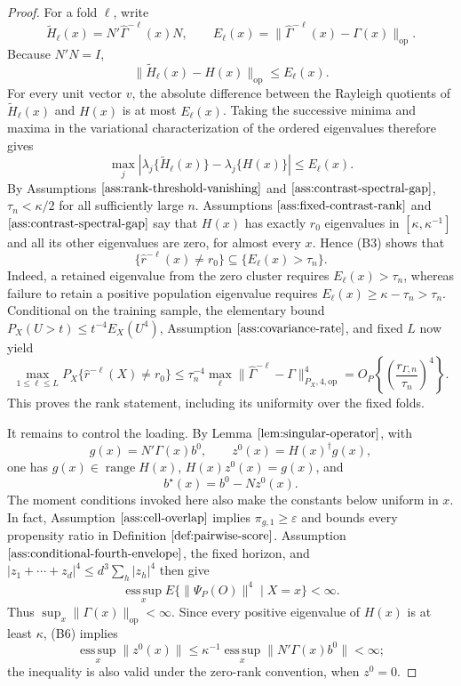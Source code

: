 \documentclass{article}
\begin{document}
\begin{proof}
For a fold \(\ell\), write
\[
 \widetilde H_\ell(x)=N'\widehat\Gamma^{-\ell}(x)N,
 \qquad
 E_\ell(x)=\|\widehat\Gamma^{-\ell}(x)-\Gamma(x)\|_{\mathrm{op}}.
 \tag{B1}
\]
Because \(N'N=I\),
\[
 \|\widetilde H_\ell(x)-H(x)\|_{\mathrm{op}}
 \le E_\ell(x).
 \tag{B2}
\]
For every unit vector \(v\), the absolute difference between the Rayleigh quotients of \(\widetilde H_\ell(x)\) and \(H(x)\) is at most \(E_\ell(x)\).  Taking the successive minima and maxima in the variational characterization of the ordered eigenvalues therefore gives
\[
 \max_j|\lambda_j\{\widetilde H_\ell(x)\}-\lambda_j\{H(x)\}|
 \le E_\ell(x).
 \tag{B3}
\]
By Assumptions \(\ref{ass:rank-threshold-vanishing}\) and \(\ref{ass:contrast-spectral-gap}\), \(\tau_n<\kappa/2\) for all sufficiently large \(n\).  Assumptions \(\ref{ass:fixed-contrast-rank}\) and \(\ref{ass:contrast-spectral-gap}\) say that \(H(x)\) has exactly \(r_0\) eigenvalues in \([\kappa,\kappa^{-1}]\) and all its other eigenvalues are zero, for almost every \(x\).  Hence (B3) shows that
\[
 \{\widehat r^{-\ell}(x)\ne r_0\}\subseteq\{E_\ell(x)>\tau_n\}.
 \tag{B4}
\]
Indeed, a retained eigenvalue from the zero cluster requires \(E_\ell(x)>\tau_n\), whereas failure to retain a positive population eigenvalue requires \(E_\ell(x)\ge\kappa-\tau_n>\tau_n\).  Conditional on the training sample, the elementary bound \(P_X(U>t)\le t^{-4}E_X(U^4)\), Assumption \(\ref{ass:covariance-rate}\), and fixed \(L\) now yield
\[
 \max_{1\le\ell\le L}P_X\{\widehat r^{-\ell}(X)\ne r_0\}
 \le \tau_n^{-4}\max_\ell\|\widehat\Gamma^{-\ell}-\Gamma\|_{P_X,4,\mathrm{op}}^4
 =O_P\!\left\{\left(\frac{r_{\Gamma,n}}{\tau_n}\right)^4\right\}.
 \tag{B5}
\]
This proves the rank statement, including its uniformity over the fixed folds.

It remains to control the loading.  By Lemma \(\ref{lem:singular-operator}\), with
\[
 g(x)=N'\Gamma(x)b^0,
 \qquad
 z^0(x)=H(x)^\dagger g(x),
 \tag{B6}
\]
one has \(g(x)\in\operatorname{range}H(x)\), \(H(x)z^0(x)=g(x)\), and
\[
 b^\star(x)=b^0-Nz^0(x).
 \tag{B7}
\]
The moment conditions invoked here also make the constants below uniform in \(x\).  In fact, Assumption \(\ref{ass:cell-overlap}\) implies \(\pi_{g,1}\ge\varepsilon\) and bounds every propensity ratio in Definition \(\ref{def:pairwise-score}\).  Assumption \(\ref{ass:conditional-fourth-envelope}\), the fixed horizon, and \(|z_1+\cdots+z_d|^4\le d^3\sum_h|z_h|^4\) then give
\[
 \operatorname*{ess\,sup}_{x}E\{\|\Psi_P(O)\|^4\mid X=x\}<\infty.
 \tag{B8}
\]
Thus \(\sup_x\|\Gamma(x)\|_{\mathrm{op}}<\infty\).  Since every positive eigenvalue of \(H(x)\) is at least \(\kappa\), (B6) implies
\[
 \operatorname*{ess\,sup}_{x}\|z^0(x)\|
 \le \kappa^{-1}\operatorname*{ess\,sup}_{x}\|N'\Gamma(x)b^0\|<\infty;
 \tag{B9}
\]
the inequality is also valid under the zero-rank convention, when \(z^0=0\).


\end{proof}
\end{document}
